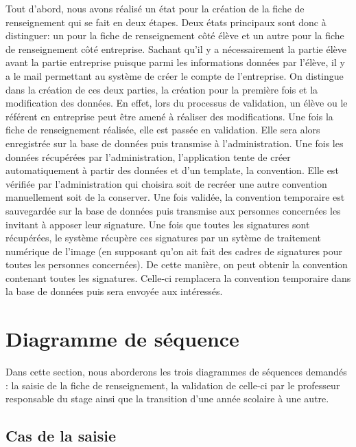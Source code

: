 \documentclass{scrreprt}
\begin{document}
	Tout d'abord, nous avons réalisé un état pour la création de la fiche de renseignement qui se fait en deux 
étapes. Deux états principaux sont donc à distinguer: un pour la fiche de renseignement côté élève et un autre pour 
la fiche de renseignement côté entreprise. Sachant qu'il y a nécessairement la partie élève avant 
la partie entreprise puisque parmi les informations données par l'élève, il y a le mail permettant au système de 
créer le compte de l'entreprise. On distingue dans la création de ces deux parties, la création pour la première fois et 
la modification des données. En effet, lors du processus de validation, un élève ou le référent en entreprise peut être 
amené à réaliser des modifications. 
	Une fois la fiche de renseignement réalisée, elle est passée en validation. Elle sera alors enregistrée sur la base
de données puis transmise à l'administration. 
	Une fois les données récupérées par l'administration, l'application tente de créer automatiquement à partir des données
et d'un template, la convention. Elle est vérifiée par l'administration qui choisira soit de recréer une autre convention manuellement
soit de la conserver. 
	Une fois validée, la convention temporaire est sauvegardée sur la base de données puis transmise aux personnes concernées les invitant
à apposer leur signature. 
	Une fois que toutes les signatures sont récupérées, le système récupère ces signatures par un sytème de traitement numérique de l'image 
(en supposant qu'on ait fait des cadres de signatures pour toutes les personnes concernées). De cette manière, on peut obtenir la convention contenant
toutes les signatures. Celle-ci remplacera la convention temporaire dans la base de données puis sera envoyée  aux intéressés.  


\newpage
\chapter{Diagramme de séquence}

	Dans cette section, nous aborderons les trois diagrammes de séquences demandés : la saisie de la fiche de renseignement,
la validation de celle-ci par le professeur responsable du stage ainsi que la transition d'une année scolaire à une autre.

\newpage
\section{Cas de la saisie}
\end{document}

